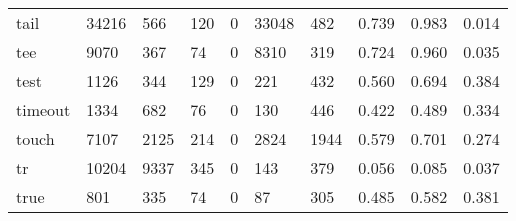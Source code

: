 \begin{longtable}{lp{2.0cm}p{2.0cm}p{2.0cm}p{2.0cm}p{2.0cm}p{2.0cm}p{2.0cm}p{2.0cm}p{2.0cm}}
tail      &                  34216 &                                566 &                               120 &                                0 &                             33048 &                             482 &                                   0.739 &                                  0.983 &                                0.014 \\
tee       &                   9070 &                                367 &                                74 &                                0 &                              8310 &                             319 &                                   0.724 &                                  0.960 &                                0.035 \\
test      &                   1126 &                                344 &                               129 &                                0 &                               221 &                             432 &                                   0.560 &                                  0.694 &                                0.384 \\
timeout   &                   1334 &                                682 &                                76 &                                0 &                               130 &                             446 &                                   0.422 &                                  0.489 &                                0.334 \\
touch     &                   7107 &                               2125 &                               214 &                                0 &                              2824 &                            1944 &                                   0.579 &                                  0.701 &                                0.274 \\
tr        &                  10204 &                               9337 &                               345 &                                0 &                               143 &                             379 &                                   0.056 &                                  0.085 &                                0.037 \\
true      &                    801 &                                335 &                                74 &                                0 &                                87 &                             305 &                                   0.485 &                                  0.582 &                                0.381 \\

\end{longtable}
